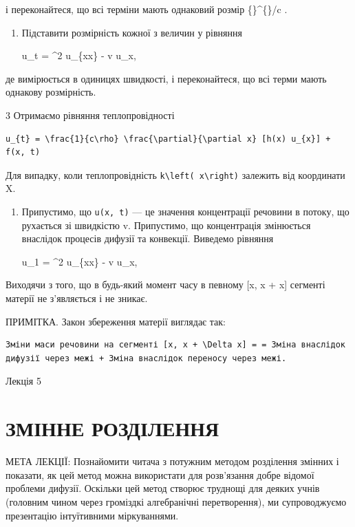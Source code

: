\documentclass[
  ukrainian,
]{article}
\begin{document}
і переконайтеся, що всі терміни мають однаковий розмір
\{\}\^{}\{\circ\}/c .

\begin{enumerate}
\def\labelenumi{\arabic{enumi}.}
\setcounter{enumi}{1}
\item
  Підставити розмірність кожної з величин у рівняння

  u\_t = \alpha\^{}2 u\_\{xx\} - v u\_x,
\end{enumerate}

де \upsilon вимірюється в одиницях швидкості, і переконайтеся, що всі
терми мають однакову розмірність.

3 Отримаємо рівняння теплопровідності

\begin{verbatim}
u_{t} = \frac{1}{c\rho} \frac{\partial}{\partial x} [h(x) u_{x}] + f(x, t)
\end{verbatim}

Для випадку, коли теплопровідність
\texttt{k\textbackslash{}left(\ x\textbackslash{}right)} залежить від
координати X.

\begin{enumerate}
\def\labelenumi{\arabic{enumi}.}
\setcounter{enumi}{3}
\item
  Припустимо, що \texttt{u(x,\ t)} --- це значення концентрації речовини
  в потоку, що рухається зі швидкістю v. Припустимо, що концентрація
  змінюється внаслідок процесів дифузії та конвекції. Виведемо рівняння

  u\_1 = \alpha\^{}2 u\_\{xx\} - v u\_x,
\end{enumerate}

Виходячи з того, що в будь-який момент часу в певному {[}x, x +
\Delta x{]} сегменті матерії не з'являється і не зникає.

ПРИМІТКА. Закон збереження матерії виглядає так:

\begin{verbatim}
Зміни маси речовини на сегменті [x, x + \Delta x] = = Зміна внаслідок дифузії через межі + Зміна внаслідок переносу через межі.
\end{verbatim}

Лекція 5

\section{ЗМІННЕ
РОЗДІЛЕННЯ}\label{ux437ux43cux456ux43dux43dux435-ux440ux43eux437ux434ux456ux43bux435ux43dux43dux44f}

МЕТА ЛЕКЦІЇ: Познайомити читача з потужним методом розділення змінних і
показати, як цей метод можна використати для розв'язання добре відомої
проблеми дифузії. Оскільки цей метод створює труднощі для деяких учнів
(головним чином через громіздкі алгебранічні перетворення), ми
супроводжуємо презентацію інтуїтивними міркуваннями.
\end{document}
